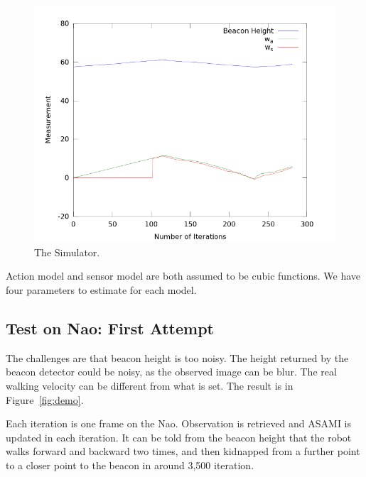\documentclass[10pt]{IEEEtran}
\begin{document}
\begin{figure}[h]
\centering
\includegraphics[width=\columnwidth]{simResult.png}
\caption{The Simulator.}
\label{fig:sim}
\end{figure}

Action model and sensor model are both assumed to be cubic functions.
We have four parameters to estimate for each model.

\subsection{Test on Nao: First Attempt}

The challenges are that beacon height is too noisy. The height
returned by the beacon detector could be noisy, as the observed image
can be blur. The real walking velocity can be different from what is
set. The result is in Figure~\ref{fig:demo}.

Each iteration is one frame on the Nao. Observation is retrieved and
ASAMI is updated in each iteration. It can be told from the beacon
height that the robot walks forward and backward two times, and then
kidnapped from a further point to a closer point to the beacon in
around 3,500 iteration.
\end{document}

